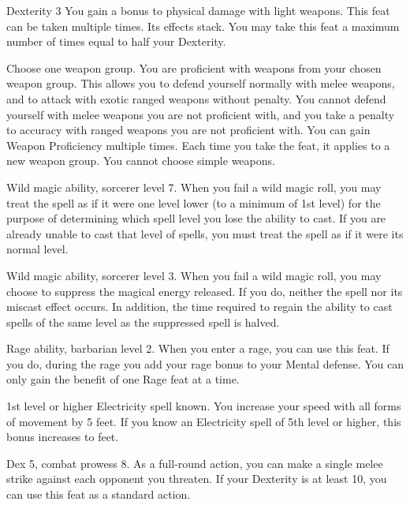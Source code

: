 \featpres Dexterity 3
\featben You gain a  bonus to physical damage with light weapons.
 This feat can be taken multiple times. Its effects stack.
You may take this feat a maximum number of times equal to half your Dexterity.

Choose one weapon group.
\featben You are proficient with weapons from your chosen weapon group.
This allows you to defend yourself normally with melee weapons, and to attack with exotic ranged weapons without penalty.
You cannot defend yourself with melee weapons you are not proficient with, and you take a  penalty to accuracy with ranged weapons you are not proficient with.
You can gain Weapon Proficiency multiple times.
Each time you take the feat, it applies to a new weapon group.
You cannot choose simple weapons.

\featpres Wild magic ability, sorcerer level 7.
\featben When you fail a wild magic roll, you may treat the spell as if it were one level lower (to a minimum of 1st level) for the purpose of determining which spell level you lose the ability to cast.
If you are already unable to cast that level of spells, you must treat the spell as if it were its normal level.

\featpres Wild magic ability, sorcerer level 3.
\featben When you fail a wild magic roll, you may choose to suppress the magical energy released.
If you do, neither the spell nor its miscast effect occurs.
In addition, the time required to regain the ability to cast spells of the same level as the suppressed spell is halved.

\featpres Rage ability, barbarian level 2.
\featben When you enter a rage, you can use this feat. If you do, during the rage you add your rage bonus to your Mental defense.
 You can only gain the benefit of one Rage feat at a time.

\featpre 1st level or higher Electricity spell known.
\featben You increase your speed with all forms of movement by 5 feet.
If you know an Electricity spell of 5th level or higher, this bonus increases to  feet.

\featpres Dex 5, combat prowess 8.
\featben As a full-round action, you can make a single melee strike against each opponent you threaten.
If your Dexterity is at least 10, you can use this feat as a standard action.

